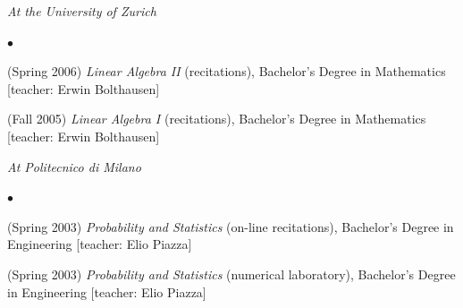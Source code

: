 \documentclass[a4paper,11pt,oneside]{amsart}
\newenvironment{myitemize}{%
\begin{list}{$\bullet$}%
 	{%
	\setlength{\itemsep}{0.3em}%
	\setlength{\topsep}{0.3em}%
	\setlength{\partopsep}{0em}%
	\setlength{\parsep}{0em}%
	\setlength{\parskip}{0em}%
	\setlength\leftmargin{1.5em}%
	\setlength\labelwidth{1.1em}%
	\setlength{\labelsep}{0.4em}%
	}%
	}%
{\end{list}}
\renewenvironment{itemize}{
\begin{myitemize}}%
{\end{myitemize}}
\begin{document}
\smallskip
\emph{At the University of Zurich}


\begin{itemize}
\item (Spring 2006)
\emph{Linear Algebra II} (recitations),
Bachelor's Degree in Mathematics
[teacher: Erwin Bolthausen]

\item (Fall 2005)
\emph{Linear Algebra I} (recitations),
Bachelor's Degree in Mathematics
[teacher: Erwin Bolthausen]
\end{itemize}


\smallskip
\emph{At Politecnico di Milano}

\begin{itemize}
\item (Spring 2003)
\emph{Probability and Statistics} (on-line recitations),
Bachelor's Degree in Engineering
[teacher: Elio Piazza]

\item (Spring 2003)
\emph{Probability and Statistics} (numerical laboratory),
Bachelor's Degree in Engineering [teacher: Elio Piazza]
\end{itemize}
\end{document}
